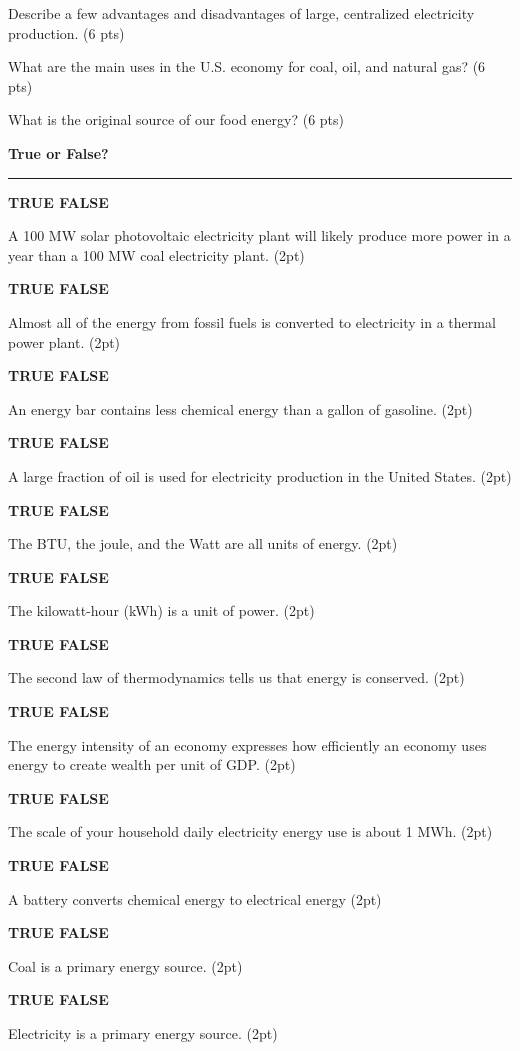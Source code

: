 \documentclass[12pt, oneside]{article}
\newif\ifsolution
\newcommand{\tf}[1]
{
\vfill
\parbox[t]{0.25\textwidth}{\bf TRUE \hspace{0.1 in} FALSE }
\parbox[t]{0.75\textwidth}{#1 (2pt)}
}
\newcommand{\chead}[1]
{\begin{center}\large\textbf{#1}\end{center}
\hrule
\vspace{10pt}}
\newcommand{\solution}[1]
{\ifsolution
Answer: {\it #1}
\else\fi}
\begin{document}
\vfill

Describe a few advantages and disadvantages of large, centralized
electricity production. (6 pts)

\solution{Advantages include economies of scale that make larger plants
more cost effective.  Disadvantages include large investments and
transmission costs.}

\vfill

What are the main uses in the U.S. economy for coal, oil, and natural gas? (6 pts)

\solution{Coal is mostly used for electricity production, oil is mostly
used for transportation, natural gas has many uses including
electricity, heating, and transportation.}

\vfill

What is the original source of our food energy? (6 pts)

\solution{The chemical energy in our food was originally radiation
energy from the sun which was converted to chemical energy by plants.
Depending on your diet, you may also consume organisms that consumed
plants.  Bonus if you mention the nuclear energy from the sun.}

\vfill


\newpage
\chead{True or False?}

\tf{A 100 MW solar photovoltaic electricity plant will likely produce
more power in a year than a 100 MW coal electricity plant.}
\solution{False}

\tf{Almost all of the energy from fossil fuels is converted to
electricity in a thermal power plant.}
\solution{False}

\tf{An energy bar contains less chemical energy than a gallon of
gasoline.}
\solution{True}

\tf{A large fraction of oil is used for electricity production in the
United States.}
\solution{False}

\tf{The BTU, the joule, and the Watt are all units of energy.}
\solution{False}

\tf{The kilowatt-hour (kWh) is a unit of power.}
\solution{False}

\tf{The second law of thermodynamics tells us that energy is conserved.}
\solution{False}

\tf{The energy intensity of an economy expresses how efficiently an
economy uses energy to create wealth per unit of GDP.}
\solution{True}

\tf{The scale of your household daily electricity energy use is about 1 MWh.}
\solution{False}

\tf{A battery converts chemical energy to electrical energy}
\solution{True}

\tf{Coal is a primary energy source.}
\solution{True}

\tf{Electricity is a primary energy source.}
\solution{False}
\end{document}
